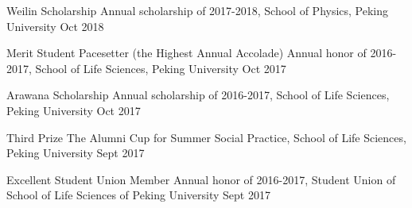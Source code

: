 \begin{cvhonors}

\cvhonor
{Weilin Scholarship} %
{Annual scholarship of 2017-2018, School of Physics, Peking University} %
{} %
{Oct 2018} %


\cvhonor
{Merit Student Pacesetter (the Highest Annual Accolade)} %
{Annual honor of 2016-2017, School of Life Sciences, Peking University} %
{} %
{Oct 2017} %


\cvhonor
{Arawana Scholarship} %
{Annual scholarship of 2016-2017, School of Life Sciences, Peking University} %
{} %
{Oct 2017} %


\cvhonor
{Third Prize} %
{The Alumni Cup for Summer Social Practice, School of Life Sciences, Peking University} %
{} %
{Sept 2017} %

\cvhonor
{Excellent Student Union Member} %
{Annual honor of 2016-2017, Student Union of School of Life Sciences of Peking University} %
{} %
{Sept 2017} %


\end{cvhonors}

